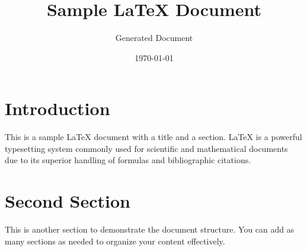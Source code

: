 \documentclass{article}
\title{Sample LaTeX Document}
\author{Generated Document}
\date{\today}
\begin{document}
\maketitle

\section{Introduction}
This is a sample LaTeX document with a title and a section. LaTeX is a powerful typesetting system commonly used for scientific and mathematical documents due to its superior handling of formulas and bibliographic citations.

\section{Second Section}
This is another section to demonstrate the document structure. You can add as many sections as needed to organize your content effectively.
\end{document}
